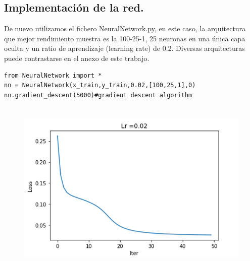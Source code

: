\documentclass[a4paper,10pt]{article}
\begin{document}
\subsection{Implementación de la red.}
De nuevo utilizamos el fichero NeuralNetwork.py, en este caso, la  arquitectura  que mejor rendimiento muestra es la 100-25-1, 25 neuronas en una única capa oculta y un ratio de aprendizaje (learning rate) de 0.2. Diversas arquitecturas puede contrastarse en el anexo de este trabajo.
\begin{lstlisting}
from NeuralNetwork import * 
nn = NeuralNetwork(x_train,y_train,0.02,[100,25,1],0)
nn.gradient_descent(5000)#gradient descent algorithm
\end{lstlisting}
\begin{figure}[H]
	\centering
	\includegraphics[width=12.0cm,height=8.5cm]{Annotation 2020-03-23171823}
\end{figure}
\end{document}
